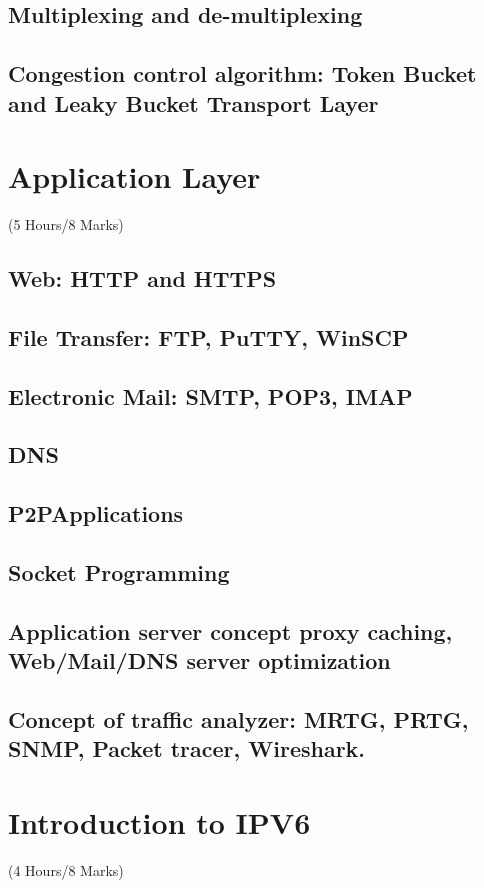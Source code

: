 \documentclass[12pt]{article}
\begin{document}
\subsection{Multiplexing and de-multiplexing}
\subsection{Congestion control algorithm: Token Bucket and Leaky Bucket Transport Layer}


\pagebreak
\section{Application Layer}
\begin{center}(5 Hours/8 Marks)\end{center}
\subsection{Web: HTTP and HTTPS}
\subsection{File Transfer: FTP, PuTTY, WinSCP}
\subsection{Electronic Mail: SMTP, POP3, IMAP}
\subsection{DNS}
\subsection{P2PApplications}
\subsection{Socket Programming}
\subsection{Application server concept proxy caching, Web/Mail/DNS server optimization}
\subsection{Concept of traffic analyzer: MRTG, PRTG, SNMP, Packet tracer, Wireshark.}

\pagebreak
\section{Introduction to IPV6}
\begin{center}(4 Hours/8 Marks)\end{center}
\end{document}
